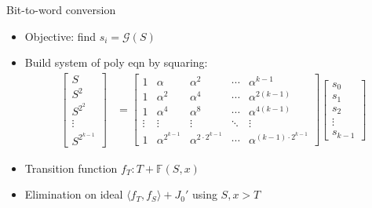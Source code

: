 \documentclass[xcolor=dvipsnames]{beamer}
\newcommand{\bi}{\begin{itemize}}
\newcommand{\ei}{\end{itemize}}
\newcommand{\F}{{\mathbb{F}}}
\begin{document}
\begin{frame}{\large{Bit-to-word conversion}}
\bi
\item Objective: find $s_i = \mathcal G(S)$
\item Build system of poly eqn by squaring:
\begin{align*}
\label{eqn:alphamat}
\begin{bmatrix}
S \\
S^2 \\
S^{2^2} \\
\vdots \\
S^{2^{k-1}}
\end{bmatrix}
&=
\begin{bmatrix}
1 & \alpha & \alpha^{2} & \cdots & \alpha^{{k-1}}\\
1 & \alpha^{2} & \alpha^{4} & \cdots & \alpha^{2(k-1)} \\
1 & \alpha^{4} & \alpha^{8} & \cdots & \alpha^{4(k-1)}\\
\vdots & \vdots & \vdots & \ddots & \vdots \\
1 & \alpha^{2^{k-1}} & \alpha^{2\cdot 2^{k-1}} & \cdots & \alpha^{(k-1)\cdot 2^{k-1}}
\end{bmatrix}
\begin{bmatrix}
s_0\\
s_1\\
s_2\\
\vdots\\
s_{k-1}
\end{bmatrix}
\end{align*}
\item Transition function $f_T: T+\F(S,x)$
\item Elimination on ideal $\langle f_T,f_S \rangle+J_0'$ using $S,x > T$
\ei
\end{frame}
\end{document}
